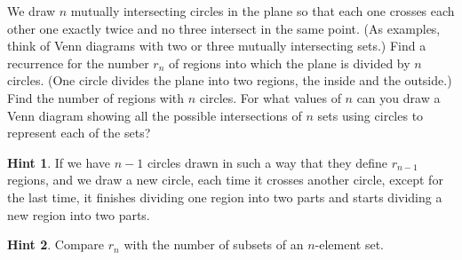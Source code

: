 \documentclass{book}
\begin{document}
\setcounter{cpjt}{138}
\addtocounter{cpjt}{-1}
\begin{activity}\label{circlesinplane}
\hypertarget{p-901}{}%
We draw \(n\) mutually intersecting circles in the plane so that each one crosses each other one exactly twice and no three intersect in the same point. (As examples, think of Venn diagrams with two or three mutually intersecting sets.) Find a recurrence for the number \(r_n\) of regions into which the plane is divided by \(n\) circles. (One circle divides the plane into two regions, the inside and the outside.) Find the number of regions with \(n\) circles. For what values of \(n\) can you draw a Venn diagram showing all the possible intersections of \(n\) sets using circles to represent each of the sets?%
\par\smallskip%
\noindent\textbf{Hint 1}.\hypertarget{hint-96}{}\quad%
\hypertarget{p-902}{}%
If we have \(n - 1\) circles drawn in such a way that they define \(r_{n-1}\) regions, and we draw a new circle, each time it crosses another circle, except for the last time, it finishes dividing one region into two parts and starts dividing a new region into two parts.%
\par\smallskip%
\noindent\textbf{Hint 2}.\hypertarget{hint-97}{}\quad%
\hypertarget{p-903}{}%
Compare \(r_n\) with the number of subsets of an \(n\)-element set.%
\par\smallskip%
\noindent\end{activity}

\clearpage
\end{document}
